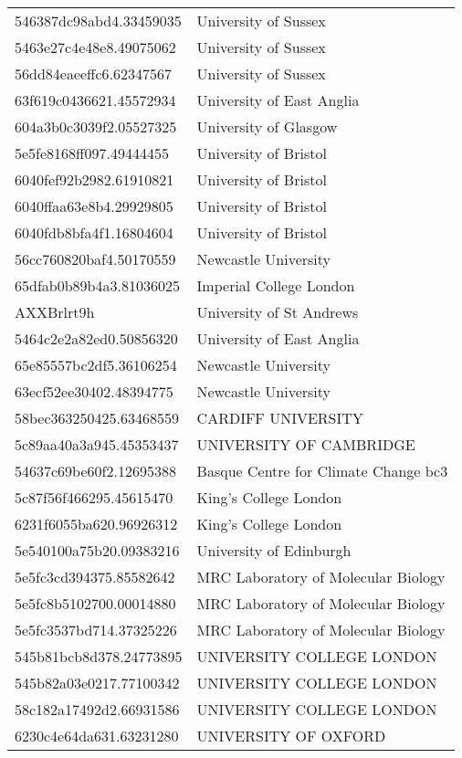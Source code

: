 \begin{tabular}{ll}
546387dc98abd4.33459035 & University of Sussex \\
5463e27c4e48e8.49075062 & University of Sussex \\
56dd84eaeeffc6.62347567 & University of Sussex \\
63f619c0436621.45572934 & University of East Anglia \\
604a3b0c3039f2.05527325 & University of Glasgow \\
5e5fe8168ff097.49444455 & University of Bristol \\
6040fef92b2982.61910821 & University of Bristol \\
6040ffaa63e8b4.29929805 & University of Bristol \\
6040fdb8bfa4f1.16804604 & University of Bristol \\
56cc760820baf4.50170559 & Newcastle University \\
65dfab0b89b4a3.81036025 & Imperial College London \\
AXXBrlrt9h & University of St Andrews \\
5464c2e2a82ed0.50856320 & University of East Anglia \\
65e85557bc2df5.36106254 & Newcastle University \\
63ecf52ee30402.48394775 & Newcastle University \\
58bec363250425.63468559 & CARDIFF UNIVERSITY \\
5c89aa40a3a945.45353437 & UNIVERSITY OF CAMBRIDGE \\
54637c69be60f2.12695388 & Basque Centre for Climate Change bc3 \\
5c87f56f466295.45615470 & King's College London \\
6231f6055ba620.96926312 & King's College London \\
5e540100a75b20.09383216 & University of Edinburgh \\
5e5fc3cd394375.85582642 & MRC Laboratory of Molecular Biology \\
5e5fc8b5102700.00014880 & MRC Laboratory of Molecular Biology \\
5e5fc3537bd714.37325226 & MRC Laboratory of Molecular Biology \\
545b81bcb8d378.24773895 & UNIVERSITY COLLEGE LONDON \\
545b82a03e0217.77100342 & UNIVERSITY COLLEGE LONDON \\
58c182a17492d2.66931586 & UNIVERSITY COLLEGE LONDON \\
6230c4e64da631.63231280 & UNIVERSITY OF OXFORD \\

\end{tabular}
